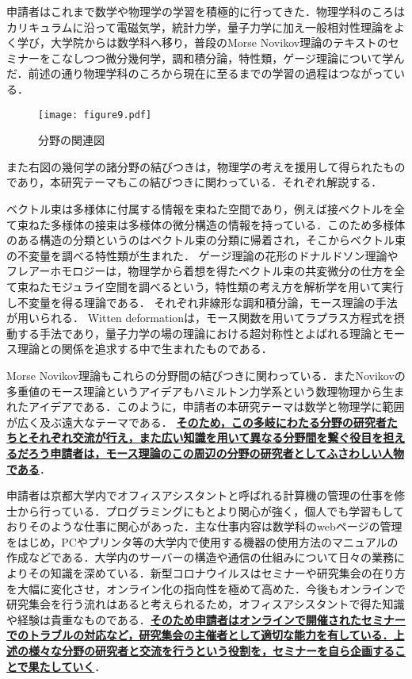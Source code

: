 \documentclass[11pt,a4j,dvipdfmx]{jarticle} 					%
\newcommand{\研究課題名}{象の卵}
\newcommand{\研究機関名}{京都大学}
\newcommand{\研究代表者氏名}{福士　謙二　　　}
\begin{document}
\noindent
{}


申請者はこれまで数学や物理学の学習を積極的に行ってきた．物理学科のころはカリキュラムに沿って電磁気学，統計力学，量子力学に加え一般相対性理論をよく学び，大学院からは数学科へ移り，普段のMorse Novikov理論のテキストのセミナーをこなしつつ微分幾何学，調和積分論，特性類，ゲージ理論について学んだ．前述の通り物理学科のころから現在に至るまでの学習の過程はつながっている．

\begin{wrapfigure}[10]{r}[0mm]{19zw}
    \vspace*{-\intextsep} %
	\texttt{[image: figure9.pdf]}
	\caption{分野の関連図}
\end{wrapfigure}

また右図の幾何学の諸分野の結びつきは，物理学の考えを援用して得られたものであり，本研究テーマもこの結びつきに関わっている．それぞれ解説する．

ベクトル束は多様体に付属する情報を束ねた空間であり，例えば接ベクトルを全て束ねた多様体の接束は多様体の微分構造の情報を持っている．このため多様体のある構造の分類というのはベクトル束の分類に帰着され，そこからベクトル束の不変量を調べる特性類が生まれた．
ゲージ理論の花形のドナルドソン理論やフレアーホモロジーは，物理学から着想を得たベクトル束の共変微分の仕方を全て束ねたモジュライ空間を調べるという，特性類の考え方を解析学を用いて実行し不変量を得る理論である．
それぞれ非線形な調和積分論，モース理論の手法が用いられる．
Witten deformationは，モース関数を用いてラプラス方程式を摂動する手法であり，量子力学の場の理論における超対称性とよばれる理論とモース理論との関係を追求する中で生まれたものである．

Morse Novikov理論もこれらの分野間の結びつきに関わっている．またNovikovの多重値のモース理論というアイデアもハミルトン力学系という数理物理から生まれたアイデアである．このように，申請者の本研究テーマは数学と物理学に範囲が広く及ぶ遠大なテーマである．
\textbf{\ul{そのため，この多岐にわたる分野の研究者たちとそれぞれ交流が行え，また広い知識を用いて異なる分野間を繋ぐ役目を担えるだろう申請者は，モース理論のこの周辺の分野の研究者としてふさわしい人物である}}．


\noindent
{}

申請者は京都大学内でオフィスアシスタントと呼ばれる計算機の管理の仕事を修士から行っている．プログラミングにもとより関心が強く，個人でも学習もしておりそのような仕事に関心があった．主な仕事内容は数学科のwebページの管理をはじめ，PCやプリンタ等の大学内で使用する機器の使用方法のマニュアルの作成などである．大学内のサーバーの構造や通信の仕組みについて日々の業務によりその知識を深めている．新型コロナウイルスはセミナーや研究集会の在り方を大幅に変化させ，オンライン化の指向性を極めて高めた．今後もオンラインで研究集会を行う流れはあると考えられるため，オフィスアシスタントで得た知識や経験は貴重なものである．\textbf{\ul{そのため申請者はオンラインで開催されたセミナーでのトラブルの対応など，研究集会の主催者として適切な能力を有している．上述の様々な分野の研究者と交流を行うという役割を，セミナーを自ら企画することで果たしていく}}．
\end{document}
